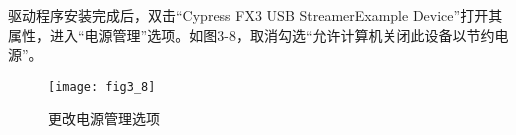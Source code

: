 驱动程序安装完成后，双击“Cypress FX3 USB StreamerExample Device”打开其属性，进入“电源管理”选项。如图3-8，取消勾选“允许计算机关闭此设备以节约电源”。
\begin{figure}[htbp]
\centering
\texttt{[image: fig3\_8]}
\caption{更改电源管理选项}
\end{figure}




